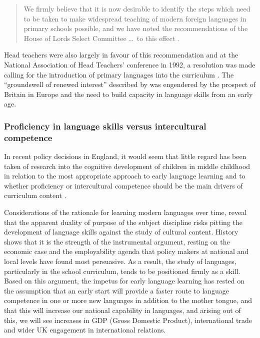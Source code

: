 \documentclass[output=paper]{langscibook}
\begin{document}
\begin{quote}
We firmly believe that it is now desirable to identify the steps which need to be taken to make widespread teaching of modern foreign languages in primary schools possible, and we have noted the recommendations of the House of Lords Select Committee \ldots\ to this effect \citep[para 3.13]{DfES1990}.
\end{quote}

\begin{sloppypar}
Head teachers were also largely in favour of this recommendation and at the National Association of Head Teachers’ conference in 1992, a resolution was made calling for the introduction of primary languages into the curriculum \citep{Satchwell1996}. The ``groundswell of renewed interest'' described by \citet{Satchwell1996} was engendered by the prospect of Britain in Europe and the need to build capacity in language skills from an early age.
\end{sloppypar}

\subsubsection{Proficiency in language skills versus intercultural competence}

In recent policy decisions in England, it would seem that little regard has been taken of research into the cognitive development of children in middle childhood in relation to the most appropriate approach to early language learning and to whether proficiency or intercultural competence should be the main drivers of curriculum content \citep{Myles2017}.

Considerations of the rationale for learning modern languages over time, reveal that the apparent duality of purpose of the subject discipline risks pitting the development of language skills against the study of cultural content. History shows that it is the strength of the instrumental argument, resting on the economic case and the employability agenda that policy makers at national and local levels have found most persuasive. As a result, the study of languages, particularly in the school curriculum, tends to be positioned firmly as a skill. Based on this argument, the impetus for early language learning has rested on the assumption that an early start will provide a faster route to language competence in one or more new languages in addition to the mother tongue, and that this will increase our national capability in languages, and arising out of this, we will see increases in GDP (Gross Domestic Product), international trade and wider UK engagement in international relations. 
\end{document}

